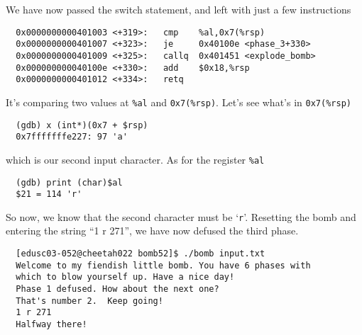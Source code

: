 We have now passed the switch statement, and left with just a few instructions
{\renewcommand\fcolorbox[4][]{\textcolor{cyan}{\strut#4}}
\begin{verbatim}
  0x0000000000401003 <+319>:   cmp    %al,0x7(%rsp)
  0x0000000000401007 <+323>:   je     0x40100e <phase_3+330>
  0x0000000000401009 <+325>:   callq  0x401451 <explode_bomb>
  0x000000000040100e <+330>:   add    $0x18,%rsp
  0x0000000000401012 <+334>:   retq
\end{verbatim}
}\noindent
It's comparing two values at \verb+%al+ and \verb+0x7(%rsp)+. Let's see what's in \verb+0x7(%rsp)+
\begin{verbatim}
  (gdb) x (int*)(0x7 + $rsp)
  0x7fffffffe227: 97 'a'
\end{verbatim}
which is our second input character. As for the register \verb+%al+
\begin{verbatim}
  (gdb) print (char)$al
  $21 = 114 'r'
\end{verbatim}
So now, we know that the second character must be `\verb+r+'. Resetting the bomb and entering the string ``1 r 271'', we have now defused the third phase.
{\renewcommand\fcolorbox[4][]{\textcolor{black}{\strut#4}}
\begin{verbatim}
  [edusc03-052@cheetah022 bomb52]$ ./bomb input.txt
  Welcome to my fiendish little bomb. You have 6 phases with
  which to blow yourself up. Have a nice day!
  Phase 1 defused. How about the next one?
  That's number 2.  Keep going!
  1 r 271
  Halfway there!
\end{verbatim}
}\noindent

\newpage